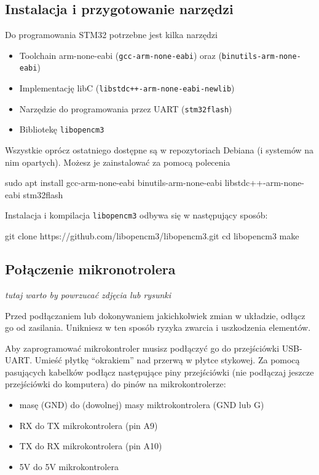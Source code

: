 \documentclass{pdfBooklets}
\begin{document}
\subsection{Instalacja i przygotowanie narzędzi}

Do programowania STM32 potrzebne jest kilka narzędzi

\begin{itemize}
  \item Toolchain arm-none-eabi (\Verb$gcc-arm-none-eabi$) oraz (\Verb$binutils-arm-none-eabi$)
  \item Implementację libC (\Verb$libstdc++-arm-none-eabi-newlib$)
  \item Narzędzie do programowania przez UART (\Verb$stm32flash$)
  \item Bibliotekę \Verb$libopencm3$
\end{itemize}
Wszystkie oprócz ostatniego dostępne są w repozytoriach Debiana (i systemów na nim opartych). Możesz je zainstalować
za pomocą polecenia

\begin{CodeFrame*}[bash]{}
sudo apt install gcc-arm-none-eabi binutils-arm-none-eabi libstdc++-arm-none-eabi stm32flash
\end{CodeFrame*}

Instalacja i kompilacja \Verb$libopencm3$ odbywa się w następujący sposób:

\begin{CodeFrame*}[bash]{}
git clone https://github.com/libopencm3/libopencm3.git
cd libopencm3
make
\end{CodeFrame*}

\subsection{Połączenie mikronotrolera}
\textit {tutaj warto by powrzucać zdjęcia lub rysunki}

\begin{ProTip}{}
  Przed podłączaniem lub dokonywaniem jakichkolwiek zmian w układzie, odłącz go od zasilania. Unikniesz
  w ten sposób ryzyka zwarcia i uszkodzenia elementów.
\end{ProTip}

Aby zaprogramować mikrokontroler musisz podłączyć go do przejściówki USB-UART. Umieść płytkę ``okrakiem'' nad przerwą
w płytce stykowej. Za pomocą pasujących kabelków podłącz następujące piny przejściówki (nie podłączaj jeszcze
przejściówki do komputera) do pinów na mikrokontrolerze:
\begin{itemize}
\item masę (GND) do (dowolnej) masy miktrokontrolera (GND lub G)
\item RX do TX mikrokontrolera (pin A9)
\item TX do RX mikrokontrolera (pin A10)
\item 5V do 5V mikrokontrolera
\end{itemize}
\end{document}
